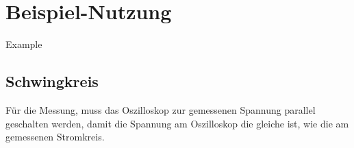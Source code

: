 \section{Beispiel-Nutzung}

Example

\subsection{Schwingkreis}

Für die Messung, muss das Oszilloskop zur gemessenen Spannung parallel geschalten werden,
damit die Spannung am Oszilloskop die gleiche ist, wie die am gemessenen Stromkreis.
